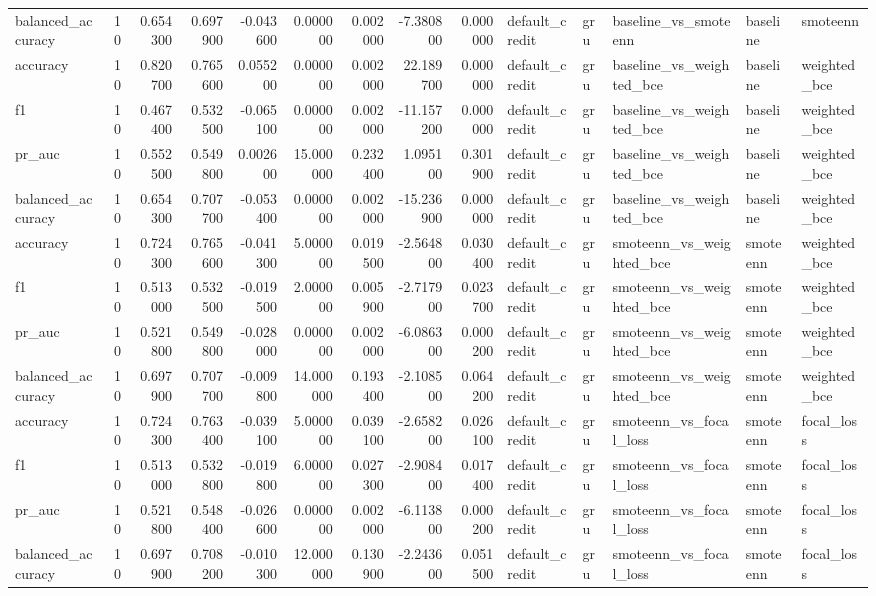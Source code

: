 \begin{tabular}{lrrrrrrrrlllll}
balanced_accuracy & 10 & 0.654300 & 0.697900 & -0.043600 & 0.000000 & 0.002000 & -7.380800 & 0.000000 & default_credit & gru & baseline_vs_smoteenn & baseline & smoteenn \\
accuracy & 10 & 0.820700 & 0.765600 & 0.055200 & 0.000000 & 0.002000 & 22.189700 & 0.000000 & default_credit & gru & baseline_vs_weighted_bce & baseline & weighted_bce \\
f1 & 10 & 0.467400 & 0.532500 & -0.065100 & 0.000000 & 0.002000 & -11.157200 & 0.000000 & default_credit & gru & baseline_vs_weighted_bce & baseline & weighted_bce \\
pr_auc & 10 & 0.552500 & 0.549800 & 0.002600 & 15.000000 & 0.232400 & 1.095100 & 0.301900 & default_credit & gru & baseline_vs_weighted_bce & baseline & weighted_bce \\
balanced_accuracy & 10 & 0.654300 & 0.707700 & -0.053400 & 0.000000 & 0.002000 & -15.236900 & 0.000000 & default_credit & gru & baseline_vs_weighted_bce & baseline & weighted_bce \\
accuracy & 10 & 0.724300 & 0.765600 & -0.041300 & 5.000000 & 0.019500 & -2.564800 & 0.030400 & default_credit & gru & smoteenn_vs_weighted_bce & smoteenn & weighted_bce \\
f1 & 10 & 0.513000 & 0.532500 & -0.019500 & 2.000000 & 0.005900 & -2.717900 & 0.023700 & default_credit & gru & smoteenn_vs_weighted_bce & smoteenn & weighted_bce \\
pr_auc & 10 & 0.521800 & 0.549800 & -0.028000 & 0.000000 & 0.002000 & -6.086300 & 0.000200 & default_credit & gru & smoteenn_vs_weighted_bce & smoteenn & weighted_bce \\
balanced_accuracy & 10 & 0.697900 & 0.707700 & -0.009800 & 14.000000 & 0.193400 & -2.108500 & 0.064200 & default_credit & gru & smoteenn_vs_weighted_bce & smoteenn & weighted_bce \\
accuracy & 10 & 0.724300 & 0.763400 & -0.039100 & 5.000000 & 0.039100 & -2.658200 & 0.026100 & default_credit & gru & smoteenn_vs_focal_loss & smoteenn & focal_loss \\
f1 & 10 & 0.513000 & 0.532800 & -0.019800 & 6.000000 & 0.027300 & -2.908400 & 0.017400 & default_credit & gru & smoteenn_vs_focal_loss & smoteenn & focal_loss \\
pr_auc & 10 & 0.521800 & 0.548400 & -0.026600 & 0.000000 & 0.002000 & -6.113800 & 0.000200 & default_credit & gru & smoteenn_vs_focal_loss & smoteenn & focal_loss \\
balanced_accuracy & 10 & 0.697900 & 0.708200 & -0.010300 & 12.000000 & 0.130900 & -2.243600 & 0.051500 & default_credit & gru & smoteenn_vs_focal_loss & smoteenn & focal_loss \\

\end{tabular}

